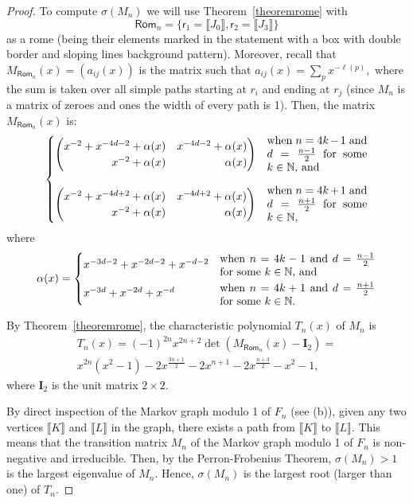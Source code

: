 \documentclass[a4paper, 11pt]{amsart}
\numberwithin{equation}{section}
\theoremstyle{customnumberedtheorem}
\theoremstyle{definitionwithbfnote}
\newcommand{\N}{\ensuremath{\mathbb{N}}}
\newcommand{\BIclass}[1]{\ensuremath{\llbracket #1\rrbracket}}
\begin{document}
\begin{proof}
To compute $\sigma(M_n)$ we will use Theorem~\ref{theoremrome} with
\[
\textsf{Rom}_n = \{\textsf{r}_1 = \BIclass{J_0}, \textsf{r}_2 = \BIclass{J_3}\}
\]
as a rome
(being their elements marked in the statement with a box with double
border and sloping lines background pattern).
Moreover, recall that $M_{\textsf{Rom}_n}(x) = (a_{ij}(x))$
is the matrix such that $a_{ij}(x) = \sum_p x^{-\ell(p)},$
where the sum is taken over all simple paths
starting at $r_i$ and ending at $r_j$
(since $M_n$ is  a matrix of zeroes and ones the width of every path is 1).
Then, the matrix $M_{\textsf{Rom}_n}(x)$ is:
\[
 \begin{cases}
   \begin{pmatrix*}[r]
        x^{-2} + x^{-4d-2} +\alpha(x) & x^{-4d-2} +\alpha(x)\\
        x^{-2}  +\alpha(x)            & \alpha(x)
   \end{pmatrix*} & \text{\parbox{9em}{when $n=4k-1$ and $d=\tfrac{n-1}{2}$ for some $k \in \N,$ and}}\\[5ex]
   \begin{pmatrix*}[r]
         x^{-2} + x^{-4d+2} +  \alpha(x) & x^{-4d+2} +\alpha(x)\\
         x^{-2}   +\alpha(x)             & \alpha(x)
  \end{pmatrix*} & \text{\parbox{9em}{when $n=4k+1$ and $d=\tfrac{n+1}{2}$ for some $k \in \N,$}}
\end{cases}
\]
where
\[
 \alpha(x) = \begin{cases}
   x^{-3d -2} +x^{-2d-2}+x^{-d-2}& \text{\parbox{14em}{when $n=4k-1$ and $d=\tfrac{n-1}{2}$ for some $k \in \N,$ and}}\\[2ex]
   x^{-3d} +x^{-2d} +x^{-d} & \text{\parbox{14em}{when $n=4k+1$ and $d=\tfrac{n+1}{2}$ for some $k \in \N.$}}
\end{cases}
\]

By Theorem~\ref{theoremrome}, the characteristic polynomial $T_n(x)$
of $M_n$ is
\begin{multline*}
    T_n(x) = (-1)^{2n} x^{2n+2} \det(M_{\textsf{Rom}_n}(x) - \mathbf{I}_2) = \\
             x^{2n}(x^2 - 1) -2x^{\tfrac{3n+1}{2}} -2x^{n+1}-2x^{\tfrac{n+3}{2}} -x^2 -1,
\end{multline*}
where $\mathbf{I}_2$ is the unit matrix $2\times 2.$

By direct inspection of the Markov graph modulo 1 of $F_n$ (see (b)),
given any two vertices $\BIclass{K}$ and $\BIclass{L}$
in the graph, there exists a path from $\BIclass{K}$ to $\BIclass{L}.$
This means that the transition matrix $M_n$ of the
Markov graph modulo 1 of $F_n$ is non-negative and irreducible.
Then, by the Perron-Frobenius Theorem, $\sigma(M_n) > 1$
is the largest eigenvalue of $M_n$.
Hence, $\sigma(M_n)$ is the largest root (larger than one) of $T_n.$
\end{proof}
\end{document}
